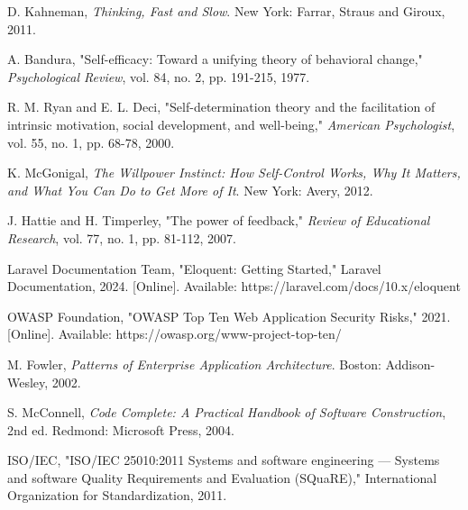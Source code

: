 \documentclass[12pt,a4paper]{report}
\begin{document}
\begin{enumerate}[label={[\arabic*]}, leftmargin=*]
  \item D. Kahneman, \textit{Thinking, Fast and Slow}. New York: Farrar, Straus and Giroux, 2011.
  
  \item A. Bandura, "Self-efficacy: Toward a unifying theory of behavioral change," \textit{Psychological Review}, vol. 84, no. 2, pp. 191-215, 1977.
  
  \item R. M. Ryan and E. L. Deci, "Self-determination theory and the facilitation of intrinsic motivation, social development, and well-being," \textit{American Psychologist}, vol. 55, no. 1, pp. 68-78, 2000.
  
  \item K. McGonigal, \textit{The Willpower Instinct: How Self-Control Works, Why It Matters, and What You Can Do to Get More of It}. New York: Avery, 2012.
  
  \item J. Hattie and H. Timperley, "The power of feedback," \textit{Review of Educational Research}, vol. 77, no. 1, pp. 81-112, 2007.
  
  \item Laravel Documentation Team, "Eloquent: Getting Started," Laravel Documentation, 2024. [Online]. Available: https://laravel.com/docs/10.x/eloquent
  
  \item OWASP Foundation, "OWASP Top Ten Web Application Security Risks," 2021. [Online]. Available: https://owasp.org/www-project-top-ten/
  
  \item M. Fowler, \textit{Patterns of Enterprise Application Architecture}. Boston: Addison-Wesley, 2002.
  
  \item S. McConnell, \textit{Code Complete: A Practical Handbook of Software Construction}, 2nd ed. Redmond: Microsoft Press, 2004.
  
  \item ISO/IEC, "ISO/IEC 25010:2011 Systems and software engineering — Systems and software Quality Requirements and Evaluation (SQuaRE)," International Organization for Standardization, 2011.
\end{enumerate}
\end{document}
